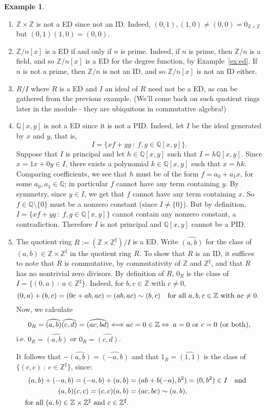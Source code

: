 \documentclass[12pt]{article}
\newcommand{\qbox}[1]{\quad\hbox{#1}\quad}
\theoremstyle{definition}
\newtheorem{example}[thm]{Example}
\newcounter{ex}\renewcommand\theex{\arabic{ex}}
\newcommand{\Z}{\ensuremath{\mathbb{Z}}}
\newcommand{\Q}{\ensuremath{\mathbb{Q}}}
\newcommand{\wh}[1]{\widehat{#1}}
\begin{document}
\begin{example}
\begin{enumerate}
\item $\Z\times\Z$ is not a ED since not an ID.
Indeed, $(0,1),(1,0)\neq(0,0)=0_{\Z\times\Z}$ but
$(0,1)(1,0)=(0,0)$.
\item $\Z/n[x]$ is a ED if and only if $n$ is prime. Indeed, if $n$ is
prime, then $\Z/n$ is a field, and so $\Z/n[x]$ is a ED for the degree
function, by Example~\ref{ex:ed}. If $n$ is not a prime, then $\Z/n$
is not an ID, and so $\Z/n[x]$ is not an ID either.
\item $R/I$ where $R$ is a ED and $I$ an ideal of $R$ need not be a
ED, as can be gathered from the previous example. (We'll come back on
such quotient rings later in the module - they are ubiquitous in
commutative algebra!)
\item $\Q[x,y]$ is not a ED since it is not a PID. Indeed, let $I$ be
the ideal generated by $x$ and $y$, that is,
$$I=\{xf+yg~:~f,g\in\Q[x,y]\}.$$
Suppose that $I$ is principal and let $h\in\Q[x,y]$ such that
$I=h\Q[x,y]$. Since $x=1x+0y\in I$, there exists a polynomial
$k\in\Q[x,y]$ such that $x=hk$. Comparing coefficients, we see that
$h$ must be of the form $f=a_0+a_1x$, for some $a_0, a_1\in\Q$; in
particular $f$ cannot have any term containing $y$.
By symmetry, since $y\in I$, we get that $f$ cannot have any term
containing $x$. So $f\in\Q\setminus\{0\}$ must be a nonzero constant
(since $I\neq\{0\}$). But by definition,
$I=\{xf+yg~:~f,g\in\Q[x,y]\}$ cannot contain any nonzero constant, a
contradiction. Therefore $I$ is not principal and $\Q[x,y]$ cannot be
a PID.
\item The quotient ring $R:=(\Z\times\Z^\sharp)/I$ is a ED. Write
$\wh{(a,b)}$ for the class of $(a,b)\in\Z\times\Z^\sharp$ in the
quotient ring $R$. To show that $R$ is an ID, it suffices to note that
$R$ is commutative, by commutativity of $\Z$ and $\Z^\sharp$, and that
$R$ has no nontrivial zero divisors. By definition of $R$,
$0_R$ is the class of $I=\{(0,a)~:~a\in\Z^\sharp\}$.
Indeed, for $b,c\in\Z$ with $c\neq0$,
$$(0,a)+(b,c)=(0c+ab,ac)=(ab,ac)\sim(b,c)\qbox{for all $a,b,c\in\Z$
with $ac\neq0$.}$$
Now, we calculate
$$0_R=\wh{(a,b)}\wh{(c,d)}=\wh{(ac,bd)}\Longleftrightarrow ac=0\in\Z
\Leftrightarrow\;\hbox{$a=0$ or $c=0$ (or both)},$$
i.e. $0_R=\wh{(a,b)}$ or $0_R=\wh{(c,d)}$.

It follows that $-\wh{(a,b)}=\wh{(-a,b)}$ and that
$1_R=\wh{(1,1)}$ is the class of $\{(c,c)~:~c\in\Z^\sharp\}$,
since:
\begin{align*}
(a,b)+(-a,b)=(-a,b)+(a,b)&=(ab+b(-a),b^2)=(0,b^2)\in I\qbox{and}\\
(a,b)(c,c)=(c,c)(a,b)&=(ac,bc)\sim(a,b),\\
\hbox{for all $(a,b)\in\Z\times\Z^\sharp$ and $c\in\Z^\sharp$.}
\end{align*}



\end{enumerate}
\end{example}
\end{document}
